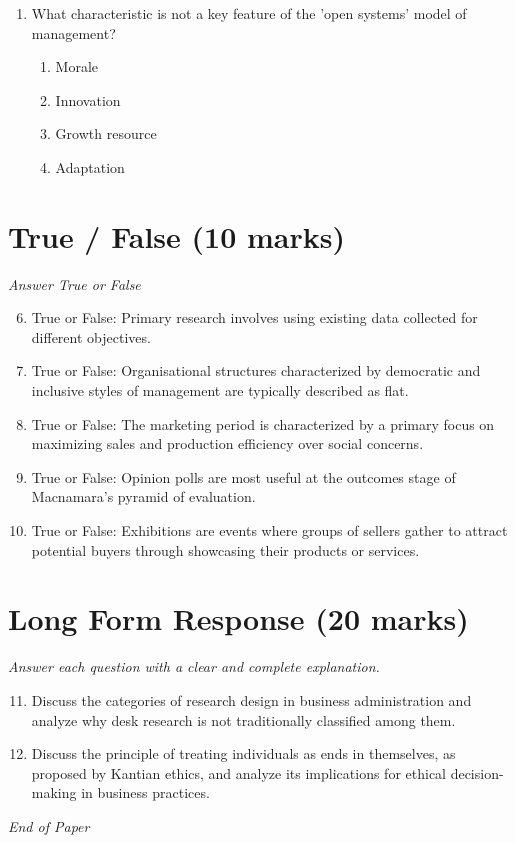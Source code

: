 \documentclass[12pt]{article}
\begin{document}
\begin{enumerate}[label=\arabic*.]
\begin{enumerate}[label=(\alph*)]
    \item Group culture
    \item Collective culture
\end{enumerate}
\item What characteristic is not a key feature of the 'open systems' model of management?
\begin{enumerate}[label=(\alph*)]
    \item Morale
    \item Innovation
    \item Growth resource
    \item Adaptation
\end{enumerate}
\end{enumerate}

\section*{True / False (10 marks)}
\textit{Answer True or False}
\begin{enumerate}[label=\arabic*.]
\setcounter{enumi}{5}
\item True or False: Primary research involves using existing data collected for different objectives.
\item True or False: Organisational structures characterized by democratic and inclusive styles of management are typically described as flat.
\item True or False: The marketing period is characterized by a primary focus on maximizing sales and production efficiency over social concerns.
\item True or False: Opinion polls are most useful at the outcomes stage of Macnamara's pyramid of evaluation.
\item True or False: Exhibitions are events where groups of sellers gather to attract potential buyers through showcasing their products or services.
\end{enumerate}

\section*{Long Form Response (20 marks)}
\textit{Answer each question with a clear and complete explanation.}
\begin{enumerate}[label=\arabic*.]
\setcounter{enumi}{10}
\item Discuss the categories of research design in business administration and analyze why desk research is not traditionally classified among them.
\item Discuss the principle of treating individuals as ends in themselves, as proposed by Kantian ethics, and analyze its implications for ethical decision-making in business practices.
\end{enumerate}

\vfill
\noindent\textit{End of Paper}
\end{document}
